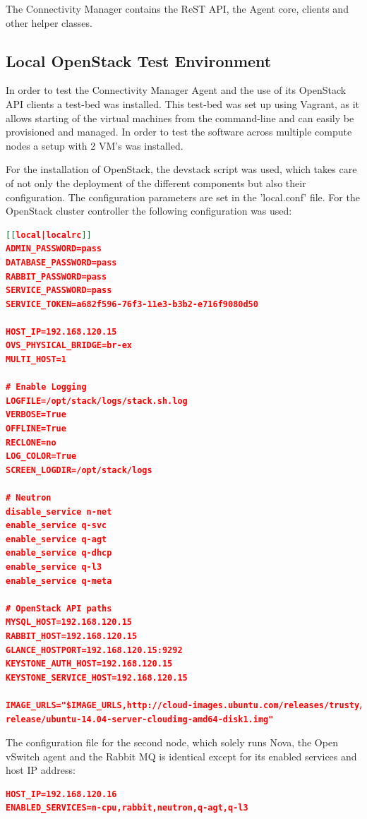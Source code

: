 The Connectivity Manager contains the ReST API, the Agent core, clients and other helper classes.

\subsection{Local OpenStack Test Environment}

In order to test the Connectivity Manager Agent and the use of its OpenStack API clients a test-bed was installed. This test-bed was set up using Vagrant, as it allows starting of the virtual machines from the command-line and can easily be provisioned and managed. In order to test the software across multiple compute nodes a setup with 2 VM's was installed.

For the installation of OpenStack, the devstack script was used, which takes care of not only the deployment of the different components but also their configuration. The configuration parameters are set in the 'local.conf' file. For the OpenStack cluster controller the following configuration was used:

\begin{lstlisting}[language=json]
[[local|localrc]]
ADMIN_PASSWORD=pass
DATABASE_PASSWORD=pass
RABBIT_PASSWORD=pass
SERVICE_PASSWORD=pass
SERVICE_TOKEN=a682f596-76f3-11e3-b3b2-e716f9080d50

HOST_IP=192.168.120.15
OVS_PHYSICAL_BRIDGE=br-ex
MULTI_HOST=1

# Enable Logging
LOGFILE=/opt/stack/logs/stack.sh.log
VERBOSE=True
OFFLINE=True
RECLONE=no
LOG_COLOR=True
SCREEN_LOGDIR=/opt/stack/logs

# Neutron
disable_service n-net
enable_service q-svc
enable_service q-agt
enable_service q-dhcp
enable_service q-l3
enable_service q-meta

# OpenStack API paths
MYSQL_HOST=192.168.120.15
RABBIT_HOST=192.168.120.15
GLANCE_HOSTPORT=192.168.120.15:9292
KEYSTONE_AUTH_HOST=192.168.120.15
KEYSTONE_SERVICE_HOST=192.168.120.15

IMAGE_URLS="$IMAGE_URLS,http://cloud-images.ubuntu.com/releases/trusty/
release/ubuntu-14.04-server-cloudimg-amd64-disk1.img"
\end{lstlisting}

The configuration file for the second node, which solely runs Nova, the Open vSwitch agent and the Rabbit MQ is identical except for its enabled services and host IP address:

\begin{lstlisting}[language=json]
HOST_IP=192.168.120.16
ENABLED_SERVICES=n-cpu,rabbit,neutron,q-agt,q-l3
\end{lstlisting}

